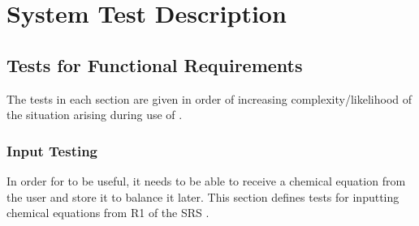 \documentclass[12pt, titlepage]{article}
\begin{document}
\section{System Test Description}

\subsection{Tests for Functional Requirements}

The tests in each section are given in order of increasing complexity/likelihood
of the situation arising during use of \progname{}.


\subsubsection{Input Testing}

In order for \progname{} to be useful, it needs to be able to receive a
chemical equation from the user and store it to balance it later. This
section defines tests for inputting chemical equations from R1 of the SRS
. 
\end{document}
